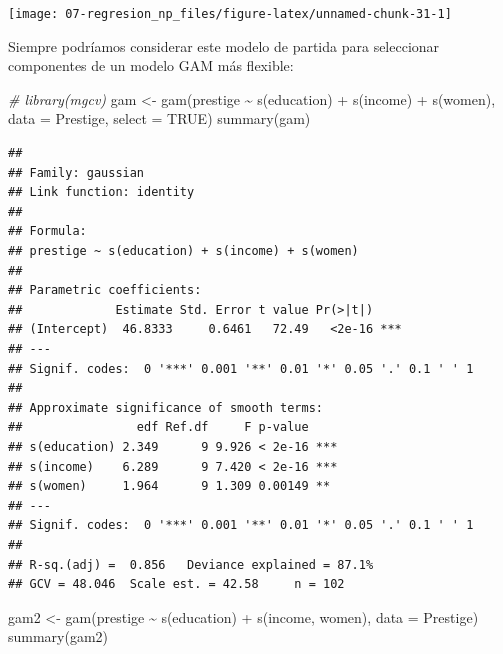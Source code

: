 \documentclass[
  spanish,
]{book}
\newenvironment{Shaded}{\begin{snugshade}}{\end{snugshade}}
\newcommand{\AttributeTok}[1]{\textcolor[rgb]{0.77,0.63,0.00}{#1}}
\newcommand{\CommentTok}[1]{\textcolor[rgb]{0.56,0.35,0.01}{\textit{#1}}}
\newcommand{\ConstantTok}[1]{\textcolor[rgb]{0.00,0.00,0.00}{#1}}
\newcommand{\FunctionTok}[1]{\textcolor[rgb]{0.00,0.00,0.00}{#1}}
\newcommand{\NormalTok}[1]{#1}
\newcommand{\OtherTok}[1]{\textcolor[rgb]{0.56,0.35,0.01}{#1}}
\newcommand{\SpecialCharTok}[1]{\textcolor[rgb]{0.00,0.00,0.00}{#1}}
\theoremstyle{break}
\theoremstyle{definition}
\theoremstyle{definition}
\theoremstyle{definition}
\theoremstyle{definition}
\theoremstyle{remark}
\begin{document}
\begin{center}\texttt{[image: 07-regresion\_np\_files/figure-latex/unnamed-chunk-31-1]} \end{center}

Siempre podríamos considerar este modelo de partida para seleccionar componentes de un modelo GAM más flexible:

\begin{Shaded}
\begin{Highlighting}[]
\CommentTok{\# library(mgcv)}
\NormalTok{gam }\OtherTok{\textless{}{-}} \FunctionTok{gam}\NormalTok{(prestige }\SpecialCharTok{\textasciitilde{}} \FunctionTok{s}\NormalTok{(education) }\SpecialCharTok{+} \FunctionTok{s}\NormalTok{(income) }\SpecialCharTok{+} \FunctionTok{s}\NormalTok{(women), }\AttributeTok{data =}\NormalTok{ Prestige, }\AttributeTok{select =} \ConstantTok{TRUE}\NormalTok{)}
\FunctionTok{summary}\NormalTok{(gam)}
\end{Highlighting}
\end{Shaded}

\begin{verbatim}
## 
## Family: gaussian 
## Link function: identity 
## 
## Formula:
## prestige ~ s(education) + s(income) + s(women)
## 
## Parametric coefficients:
##             Estimate Std. Error t value Pr(>|t|)    
## (Intercept)  46.8333     0.6461   72.49   <2e-16 ***
## ---
## Signif. codes:  0 '***' 0.001 '**' 0.01 '*' 0.05 '.' 0.1 ' ' 1
## 
## Approximate significance of smooth terms:
##                edf Ref.df     F p-value    
## s(education) 2.349      9 9.926 < 2e-16 ***
## s(income)    6.289      9 7.420 < 2e-16 ***
## s(women)     1.964      9 1.309 0.00149 ** 
## ---
## Signif. codes:  0 '***' 0.001 '**' 0.01 '*' 0.05 '.' 0.1 ' ' 1
## 
## R-sq.(adj) =  0.856   Deviance explained = 87.1%
## GCV = 48.046  Scale est. = 42.58     n = 102
\end{verbatim}

\begin{Shaded}
\begin{Highlighting}[]
\NormalTok{gam2 }\OtherTok{\textless{}{-}} \FunctionTok{gam}\NormalTok{(prestige }\SpecialCharTok{\textasciitilde{}} \FunctionTok{s}\NormalTok{(education) }\SpecialCharTok{+} \FunctionTok{s}\NormalTok{(income, women), }\AttributeTok{data =}\NormalTok{ Prestige)}
\FunctionTok{summary}\NormalTok{(gam2)}
\end{Highlighting}
\end{Shaded}
\end{document}
